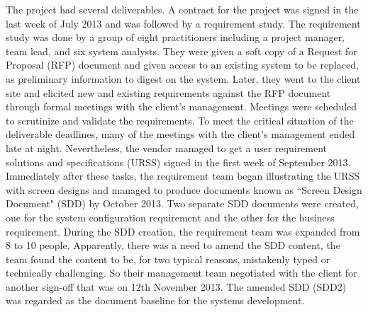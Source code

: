 \documentclass[conference]{IEEEtran}
\begin{document}
The project had several deliverables. A contract for the project was
signed in the last week of July 2013 and was followed by a requirement
study. The requirement study was done by a group of eight
practitioners including a project manager, team lead, and six system
analysts. They were given a soft copy of a Request for Proposal (RFP)
document and given access to an existing system to be replaced, as
preliminary information to digest on the system. Later, they went to
the client site and elicited new and existing requirements against the
RFP document through formal meetings with the client's
management. Meetings were scheduled to scrutinize and validate the
requirements. To meet the critical situation of the deliverable
deadlines, many of the meetings with the client's management ended
late at night. Nevertheless, the vendor managed to get a user
requirement solutions and specifications (URSS) signed in the first
week of September 2013. Immediately after these tasks, the requirement
team began illustrating the URSS with screen designs and managed to
produce documents known as ``Screen Design Document" (SDD) by October
2013. Two separate SDD documents were created, one for the system
configuration requirement and the other for the business
requirement. During the SDD creation, the requirement team was
expanded from 8 to 10 people. Apparently, there was a need to amend
the SDD content, the team found the content to be, for two typical
reasons, mistakenly typed or technically challenging. So their
management team negotiated with the client for another sign-off that
was on 12th November 2013. The amended SDD (SDD2) was regarded as the
document baseline for the systems development.
\end{document}
